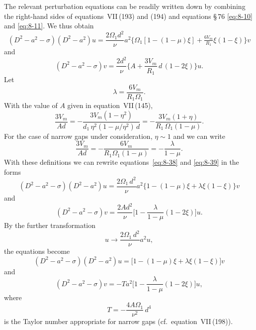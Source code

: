 The relevant perturbation equations can be readily written down by combining the right-hand sides of equations~VII\,(193) and (194) and equations \S\,76 \eqref{eq:8-10} and \eqref{eq:8-11}. We thus obtain
\begin{equation}
\label{eq:8-38}
(D^2 - a^2 - \sigma)(D^2 - a^2)u = \frac{2\Omega_1 d^2}{\nu}a^2\bigl\{\Omega_1[1-(1-\mu)\xi] + \tfrac{6V_m}{R_1}\xi(1-\xi)\bigr\}v
\end{equation}
and
\begin{equation}
\label{eq:8-39}
(D^2 - a^2 - \sigma)v = \frac{2d^2}{\nu}\biggl\{A + \frac{3V_m}{R_1}\,d\,(1-2\xi)\biggr\}u.
\end{equation}
Let
\begin{equation}
\label{eq:8-40}
\lambda = \frac{6V_m}{R_1\Omega_1}.
\end{equation}
With the value of $A$ given in equation~VII\,(145),
\begin{equation}
\label{eq:8-41}
\frac{3V_m}{Ad} = -\frac{3V_m(1-\eta^2)}{d_1\,\eta^2(1-\mu/\eta^2)\,d} = -\frac{3V_m(1+\eta)}{R_1\,\Omega_1(1-\mu)}.
\end{equation}
For the case of narrow gaps under consideration, $\eta \sim 1$ and we can write
\begin{equation}
\label{eq:8-42}
\frac{3V_m}{Ad} = -\frac{6V_m}{R_1\Omega_1(1-\mu)} = -\frac{\lambda}{1-\mu}.
\end{equation}
With these definitions we can rewrite equations~\eqref{eq:8-38} and \eqref{eq:8-39} in the forms
\begin{equation}
\label{eq:8-43}
(D^2 - a^2 - \sigma)(D^2 - a^2)u = \frac{2\Omega_1\,d^2}{\nu}a^2\bigl\{1-(1-\mu)\xi + \lambda\xi(1-\xi)\bigr\}v
\end{equation}
and
\begin{equation}
\label{eq:8-44}
(D^2 - a^2 - \sigma)v = \frac{2Ad^2}{\nu}\biggl[1 - \frac{\lambda}{1-\mu}(1-2\xi)\biggr]u.
\end{equation}
By the further transformation
\begin{equation}
\label{eq:8-45}
u \to \frac{2\Omega_1\,d^2}{\nu}a^2 u,
\end{equation}
the equations become
\begin{equation}
\label{eq:8-46}
(D^2 - a^2 - \sigma)(D^2 - a^2)u = \bigl[1-(1-\mu)\xi + \lambda\xi(1-\xi)\bigr]v
\end{equation}
and
\begin{equation}
\label{eq:8-47}
(D^2 - a^2 - \sigma)v = -Ta^2\biggl[1 - \frac{\lambda}{1-\mu}(1-2\xi)\biggr]u,
\end{equation}
where
\begin{equation}
\label{eq:8-48}
T = -\frac{4A\Omega_1}{\nu^2}\,d^4
\end{equation}
is the Taylor number appropriate for narrow gaps (cf.\ equation~VII\,(198)).

